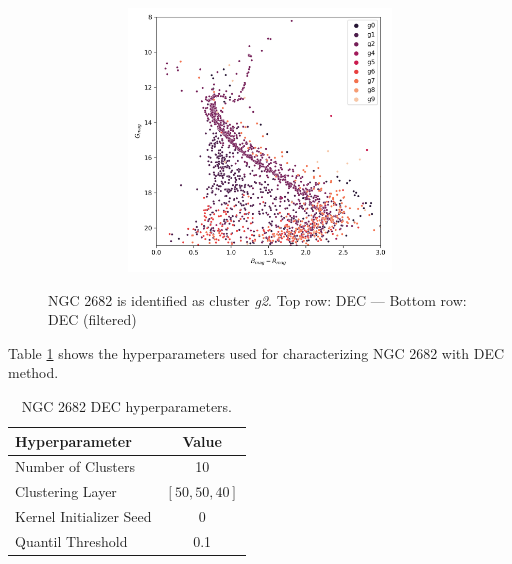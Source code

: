 \documentclass[11pt,a4paper,english,twocolumn]{article}
\begin{document}
\begin{figure}[htbp]
\begin{subfigure}{\columnwidth}
\begin{subfigure}[t]{0.30\textwidth}
    \end{subfigure}
    \hfill
    \begin{subfigure}[t]{0.30\textwidth}
      \centering
      \includegraphics[width=\textwidth]{../figures/ngc_2682/dec_hr_diagram_filtered_ngc_2682.png}
    \end{subfigure}
  \end{subfigure}
  \caption{NGC 2682 is identified as cluster \emph{g2}.
           Top row: DEC --- Bottom row: DEC (filtered)}
  \label{fig:app_result_ngc_2682_dec}
\end{figure}

Table \ref{tab:app_hyperparameters_ngc_2682} shows the
hyperparameters used for characterizing NGC 2682 with DEC method.

\begin{table}[htbp]
  \begin{center}
    \begin{tabular}{l|c}
      \textbf{Hyperparameter} & \textbf{Value} \\
      \hline
      Number of Clusters & 10 \\
      Clustering Layer & $\left[ 50, 50, 40 \right]$ \\
      Kernel Initializer Seed & 0 \\
      Quantil Threshold & 0.1 \\
    \end{tabular}
    \caption{NGC 2682 DEC hyperparameters.}
    \label{tab:app_hyperparameters_ngc_2682}
  \end{center}
\end{table}
\end{document}
